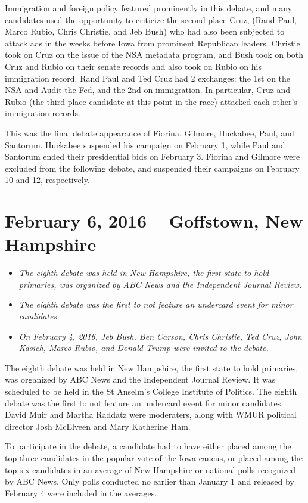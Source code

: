 Immigration and foreign policy featured prominently in this debate, and
many candidates used the opportunity to criticize the second-place Cruz,
(Rand Paul, Marco Rubio, Chris Christie, and Jeb Bush) who had also been
subjected to attack ads in the weeks before Iowa from prominent
Republican leaders. Christie took on Cruz on the issue of the NSA
metadata program, and Bush took on both Cruz and Rubio on their senate
records and also took on Rubio on his immigration record. Rand Paul and
Ted Cruz had 2 exchanges: the 1st on the NSA and Audit the Fed, and the
2nd on immigration. In particular, Cruz and Rubio (the third-place
candidate at this point in the race) attacked each other's immigration
records.

This was the final debate appearance of Fiorina, Gilmore, Huckabee,
Paul, and Santorum. Huckabee suspended his campaign on February 1, while
Paul and Santorum ended their presidential bids on February 3. Fiorina
and Gilmore were excluded from the following debate, and suspended their
campaigns on February 10 and 12, respectively.

\section{February 6, 2016 -- Goffstown, New
Hampshire}\label{february-6-2016-goffstown-new-hampshire}

\begin{itemize}
\item
  \emph{The eighth debate was held in New Hampshire, the first state to
  hold primaries, was organized by ABC News and the Independent Journal
  Review.}
\item
  \emph{The eighth debate was the first to not feature an undercard
  event for minor candidates.}
\item
  \emph{On February 4, 2016, Jeb Bush, Ben Carson, Chris Christie, Ted
  Cruz, John Kasich, Marco Rubio, and Donald Trump were invited to the
  debate.}
\end{itemize}

The eighth debate was held in New Hampshire, the first state to hold
primaries, was organized by ABC News and the Independent Journal Review.
It was scheduled to be held in the St Anselm's College Institute of
Politics. The eighth debate was the first to not feature an undercard
event for minor candidates. David Muir and Martha Raddatz were
moderaters, along with WMUR political director Josh McElveen and Mary
Katherine Ham.

To participate in the debate, a candidate had to have either placed
among the top three candidates in the popular vote of the Iowa caucus,
or placed among the top six candidates in an average of New Hampshire or
national polls recognized by ABC News. Only polls conducted no earlier
than January 1 and released by February 4 were included in the averages.

